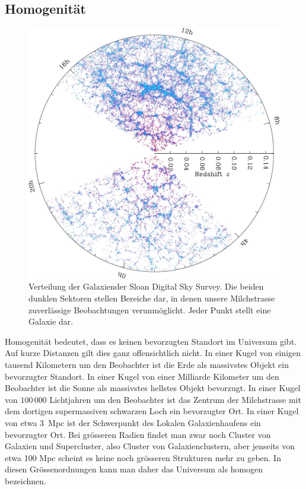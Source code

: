\subsection{Homogenität}
\begin{figure}
\centering
\includegraphics[width=\hsize]{chapters/images/orangepie-negative.jpg}
\caption{Verteilung der Galaxiender Sloan Digital Sky Survey.
Die beiden dunklen Sektoren stellen Bereiche dar, in denen unsere
Milchstrasse zuverlässige Beobachtungen verunmöglicht.
Jeder Punkt stellt eine Galaxie dar.
\label{skript:robertson:orangepie}}
\end{figure}

Homogenität bedeutet, dass es keinen bevorzugten Standort im Universum gibt.
Auf kurze Distanzen gilt dies ganz offensichtlich nicht.
In einer Kugel von einigen tausend Kilometern um den Beobachter ist
die Erde als massivstes Objekt ein bevorzugter Standort.
In einer Kugel von einer Milliarde Kilometer um den Beobachter ist
die Sonne als massivstes hellstes Objekt bevorzugt.
In einer Kugel von $100\,000$ Lichtjahren um den Beobachter ist das Zentrum
der Milchstrasse mit dem dortigen supermassiven schwarzen Loch ein
bevorzugter Ort.
In einer Kugel von etwa 3~Mpc ist der Schwerpunkt des Lokalen Galaxienhaufens
ein bevorzugter Ort.
Bei grösseren Radien findet man zwar noch Cluster von Galaxien und
Supercluster, also Cluster von Galaxienclustern, aber jenseits von
etwa 100 Mpc scheint es keine noch grösseren Strukturen mehr zu geben.
In diesen Grössenordnungen kann man daher das Universum als homogen
bezeichnen.

